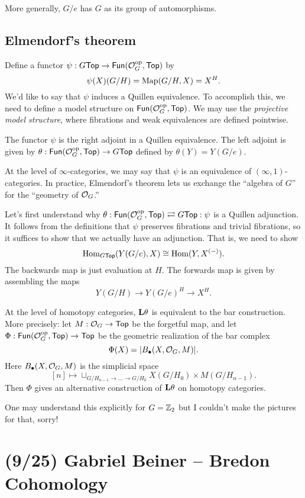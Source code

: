 \documentclass{article}
\begin{document}
More generally, $G/e$ has $G$ as its group of automorphisms.

\subsection{Elmendorf's theorem}

Define a functor $\psi: G\mathsf{Top} \to \mathsf{Fun}(\mathcal{O}_G^{\mathrm{op}}, \mathsf{Top})$ by 
\[
  \psi(X)(G/H) = \operatorname{Map}(G/H, X) = X^H.
\]
We'd like to say that $\psi$ induces a Quillen equivalence.
To accomplish this, we need to define a model structure on $\mathsf{Fun}(\mathcal{O}_G^{\mathrm{op}}, \mathsf{Top})$.
We may use the \emph{projective model structure}, where fibrations and weak equivalences are defined pointwise.

\begin{thm}[Elmendorf]
  The functor $\psi$ is the right adjoint in a Quillen equivalence.
  The left adjoint is given by $\theta: \mathsf{Fun}(\mathcal{O}_G^{\mathrm{op}}, \mathsf{Top}) \to G\mathsf{Top}$ defined by $\theta(Y) = Y(G / e)$.
\end{thm}

At the level of $\infty$-categories, we may say that $\psi$ is an equivalence of $(\infty, 1)$-categories.
In practice, Elmendorf's theorem lets us exchange the ``algebra of $G$'' for the ``geometry of $\mathcal{O}_G$.''

Let's first understand why $\theta: \mathsf{Fun}(\mathcal{O}_G^{\mathrm{op}}, \mathsf{Top}) \rightleftarrows G\mathsf{Top} :\psi$ is a Quillen adjunction.
It follows from the definitions that $\psi$ preserves fibrations and trivial fibrations, so it suffices to show that we actually have an adjunction.
That is, we need to show
\[
  \operatorname{Hom}_{G\mathsf{Top}}(Y(G/e), X) \cong \operatorname{Hom}(Y, X^{(-)}).
\]
The backwards map is just evaluation at $H$.
The forwards map is given by assembling the maps
\[
  Y(G/H) \to Y(G/e)^H \to X^H.
\]

At the level of homotopy categories, $\mathbf{L} \theta$ is equivalent to the bar construction.
More precisely: let $M: \mathcal{O}_G \to \mathsf{Top}$ be the forgetful map, and let $\Phi: \mathsf{Fun}(\mathcal{O}_G^{\mathrm{op}}, \mathsf{Top}) \to \mathsf{Top}$ be the geometric realization of the bar complex
\[
  \Phi(X) = |B_\bullet(X, \mathcal{O}_G, M)|.
\]
Here $B_\bullet(X, \mathcal{O}_G, M)$ is the simplicial space
\[
  [n] \mapsto \sqcup_{G / H_{n-1} \to \dots \to G / H_0} X(G / H_0) \times M(G / H_{n-1}).
\]
Then $\Phi$ gives an alternative construction of $\mathbf{L} \theta$ on homotopy categories.

One may understand this explicitly for $G = \mathbb{Z}_2$ but I couldn't make the pictures for that, sorry!

\section{(9/25) Gabriel Beiner -- Bredon Cohomology}
\end{document}
